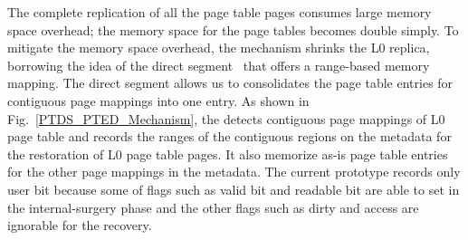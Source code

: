 
The complete replication of all the page table pages consumes large memory space overhead; the memory space for the page tables becomes double simply. To mitigate the memory space overhead, the {\ptdup} mechanism shrinks the L0 replica, borrowing the idea of the direct segment~\cite{Basu2010} that offers a range-based memory mapping. The direct segment allows us to consolidates the page table entries for contiguous page mappings into one entry. As shown in Fig.~\ref{PTDS_PTED_Mechanism}, the {\ptdup} detects contiguous page mappings of L0 page table and records the ranges of the contiguous regions on the metadata for the restoration of L0 page table pages. It also memorize as-is page table entries for the other page mappings in the metadata. The current prototype records only user bit because some of flags such as valid bit and readable bit are able to set in the internal-surgery phase and the other flags such as dirty and access are ignorable for the recovery.
